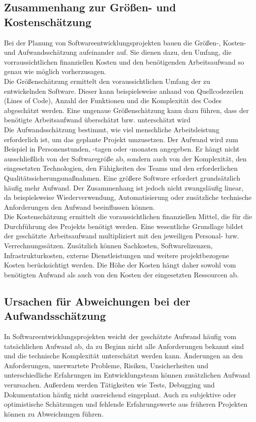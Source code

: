 \documentclass[a4paper,10pt]{article}
\begin{document}
        \subsection*{Zusammenhang zur Grö\ss{}en- und Kostenschätzung}
        Bei der Planung von Softwareentwicklungsprojekten bauen die Grö\ss{}en-, Kosten- und Aufwandsschätzung aufeinander auf.
    Sie dienen dazu, den Umfang, die vorraussichtlichen finanziellen Kosten und den benötigenden Arbeitsaufwand so genau wie möglich vorherzusagen.
        \\\newline
        Die Grö\ss{}enschätzung ermittelt den voraussichtlichen Umfang der zu entwickelnden Software.
    Dieser kann beispielsweise anhand von Quellcodezeilen (Lines of Code), Anzahl der Funktionen und die Komplexität des Codes abgeschätzt werden.
    Eine ungenaue Grö\ss{}enschätzung kann dazu führen, dass der benötigte Arbeitsaufwand überschätzt bzw. unterschätzt wird
        \\\newline
        Die Aufwandsschätzung bestimmt, wie viel menschliche Arbeitsleistung erforderlich ist, um das geplante Projekt umzusetzen. Der Aufwand wird zum Beispiel in Personenstunden, -tagen oder -monaten angegeben.
        Er hängt nicht ausschlie\ss{}lich von der Softwaregrö\ss{}e ab, sondern auch von der Komplexität, den eingesetzten Technologien, den Fähigkeiten des Teams und den erforderlichen Qualitätssicherungsma\ss{}nahmen.
    Eine grö\ss{}ere Software erfordert grundsätzlich häufig mehr Aufwand. Der Zusammenhang ist jedoch nicht zwangsläufig linear, da beispielsweise Wiederverwendung, Automatisierung oder zusätzliche technische Anforderungen den Aufwand beeinflussen können.
        \\\newline
        Die Kostenschätzung ermittelt die voraussichtlichen finanziellen Mittel, die für die Durchführung des Projekts benötigt werden.
        Eine wesentliche Grundlage bildet der geschätzte Arbeitsaufwand multipliziert mit den jeweiligen Personal- bzw. Verrechnungssätzen.
        Zusätzlich können Sachkosten, Softwarelizenzen, Infrastrukturkosten, externe Dienstleistungen und weitere projektbezogene Kosten berücksichtigt werden.
        Die Höhe der Kosten hängt daher sowohl vom benötigten Aufwand als auch von den Kosten der eingesetzten Ressourcen ab.

        \subsection*{Ursachen für Abweichungen bei der Aufwandsschätzung}
        In Softwareentwicklungsprojekten weicht der geschätzte Aufwand häufig vom tatsächlichen Aufwand ab, da zu Beginn nicht alle Anforderungen bekannt sind und die technische Komplexität unterschätzt werden kann.
        Änderungen an den Anforderungen, unerwartete Probleme, Risiken, Unsicherheiten und unterschiedliche Erfahrungen im Entwicklungsteam können zusätzlichen Aufwand verursachen.
        Au\ss{}erdem werden Tätigkeiten wie Tests, Debugging und Dokumentation häufig nicht ausreichend eingeplant.
    Auch zu subjektive oder optimistische Schätzungen und fehlende Erfahrungswerte aus früheren Projekten können zu Abweichungen führen.
\end{document}
